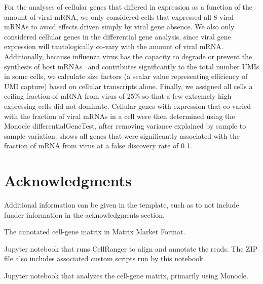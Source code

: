 \documentclass[9pt,lineno]{elife}
\begin{document}
For the analyses of cellular genes that differed in expression as a function of the amount of viral mRNA, we only considered cells that expressed all 8 viral mRNAs to avoid effects driven simply by viral gene absence.
We also only considered cellular genes in the differential gene analysis, since viral gene expression will tautologically co-vary with the amount of viral mRNA.
Additionally, because influenza virus has the capacity to degrade or prevent the synthesis of host mRNAs~\citep{BercovichKinori:2016iw} and contributes significantly to the total number UMIs in some cells, we calculate size factors (a scalar value representing efficiency of UMI capture) based on cellular transcripts alone. 
Finally, we assigned all cells a ceiling fraction of mRNA from virus of 25\% so that a few extremely high-expressing cells did not dominate. 
Cellular genes with expression that co-varied with the fraction of viral mRNAs in a cell were then determined using the Monocle differentialGeneTest, after removing variance explained by sample to sample variation. 
\label{fig:cellulargenes} shows all genes that were significantly associated with the fraction of mRNA from virus at a false discovery rate of 0.1.

\section{Acknowledgments}

Additional information can be given in the template, such as to not include funder information in the acknowledgments section.

\nocite{*} %


\clearpage

\begin{suppfile}
\caption{\label{suppfile:cellgenematrix}
The annotated cell-gene matrix in Matrix Market Format.}
\end{suppfile}

\begin{suppfile}
\caption{\label{suppfile:alignandannotate}
Jupyter notebook that runs CellRanger to align and annotate the reads.
The ZIP file also includes associated custom scripts run by this notebook.}
\end{suppfile}

\begin{suppfile}
\caption{\label{suppfile:monocle}
Jupyter notebook that analyzes the cell-gene matrix, primarily using Monocle.}
\end{suppfile}
\end{document}
